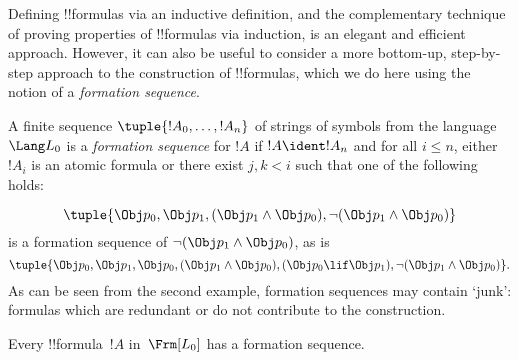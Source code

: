 \documentclass[../../../include/open-logic-section]{subfiles}
\begin{document}

Defining !!{formula}s via an inductive definition, and the
complementary technique of proving properties of !!{formula}s via
induction, is an elegant and efficient approach. However, it can
also be useful to consider a more bottom-up, step-by-step approach
to the construction of !!{formula}s, which we do here using the
notion of a \emph{formation sequence}.

\begin{defn}
A finite sequence $\tuple{!A_0,\dotsc,!A_n}$ of strings of
symbols from the language~$\Lang L_0$ is a \emph{formation
sequence} for $!A$ if $!A \ident !A_n$ and for all $i \leq n$,
either $!A_i$ is an atomic formula or there exist $j,k < i$
such that one of the following holds:
\begin{enumerate}
\end{enumerate}
\end{defn}

\begin{ex}
\[
\tuple{
    \Obj p_0,
    \Obj p_1,
    (\Obj p_1 \land \Obj p_0),
    \lnot (\Obj p_1 \land \Obj p_0)
}
\]
is a formation sequence of
$\lnot (\Obj p_1 \land \Obj p_0)$, as is
\[
\tuple{
    \Obj p_0,
    \Obj p_1,
    \Obj p_0,
    (\Obj p_1 \land \Obj p_0),
    (\Obj p_0 \lif \Obj p_1),
    \lnot (\Obj p_1 \land \Obj p_0)
}.
\]
%
As can be seen from the second example, formation sequences
may contain `junk': formulas which are redundant or do not
contribute to the construction.
\end{ex}

\begin{prop}
Every !!{formula}~$!A$ in~$\Frm[L_0]$ has a formation sequence.
\end{prop}
\end{document}
